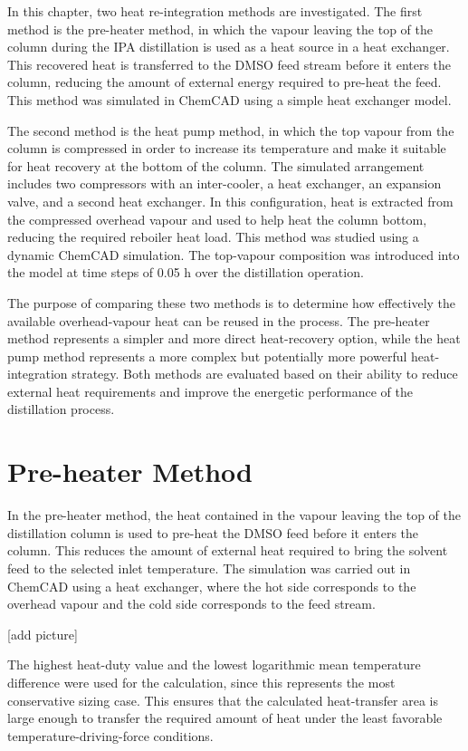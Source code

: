 In this chapter, two heat re-integration methods are investigated. The
first method is the pre-heater method, in which the vapour leaving the
top of the column during the IPA distillation is used as a heat source
in a heat exchanger. This recovered heat is transferred to the DMSO feed
stream before it enters the column, reducing the amount of external
energy required to pre-heat the feed. This method was simulated in
ChemCAD using a simple heat exchanger model.

The second method is the heat pump method, in which the top vapour from
the column is compressed in order to increase its temperature and make
it suitable for heat recovery at the bottom of the column. The simulated
arrangement includes two compressors with an inter-cooler, a heat
exchanger, an expansion valve, and a second heat exchanger. In this
configuration, heat is extracted from the compressed overhead vapour and
used to help heat the column bottom, reducing the required reboiler heat
load. This method was studied using a dynamic ChemCAD simulation. The
top-vapour composition was introduced into the model at time steps of
0.05 h over the distillation operation.

The purpose of comparing these two methods is to determine how
effectively the available overhead-vapour heat can be reused in the
process. The pre-heater method represents a simpler and more direct
heat-recovery option, while the heat pump method represents a more
complex but potentially more powerful heat-integration strategy. Both
methods are evaluated based on their ability to reduce external heat
requirements and improve the energetic performance of the distillation
process.

\section{Pre-heater Method}\label{pre-heater-method}

In the pre-heater method, the heat contained in the vapour leaving the
top of the distillation column is used to pre-heat the DMSO feed before
it enters the column. This reduces the amount of external heat required
to bring the solvent feed to the selected inlet temperature. The
simulation was carried out in ChemCAD using a heat exchanger, where the
hot side corresponds to the overhead vapour and the cold side
corresponds to the feed stream.

{[}add picture{]}

The highest heat-duty value and the lowest logarithmic mean temperature
difference were used for the calculation, since this represents the most
conservative sizing case. This ensures that the calculated heat-transfer
area is large enough to transfer the required amount of heat under the
least favorable temperature-driving-force conditions.

